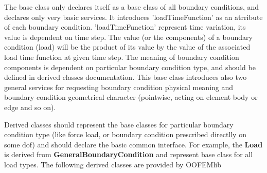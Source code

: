 \documentclass[12pt,draft]{article}
\newcommand{\class}[1]{{\bf #1}}
\begin{document}
The base class only declares itself as a base class of all boundary
conditions, and declares only very basic services. It introduces 
'loadTimeFunction' as an atrribute of each boundary condition. 
'loadTimeFunction' represent time variation, its value is dependent on time step.
The value (or the components) of a boundary condition (load) will be 
the product of its value by the value of the associated load time function at given time step.
The meaning of boundary condition components is dependent on particular boundary condition type,
and should be defined in derived classes documentation. This base
class introduces also two general services for requesting  boundary
condition physical meaning and boundary condition geometrical
character (pointwise, acting on element body or edge and so on).

Derived classes should represent the base classes for particular boundary condition type (like
force load, or boundary condition prescribed directlly on some dof) and should declare
the basic common interface. For example, the \class{Load} is derived
from \class{GeneralBoundaryCondition} and represent base class for all
load types. The following derived classes are provided by OOFEMlib
\end{document}
